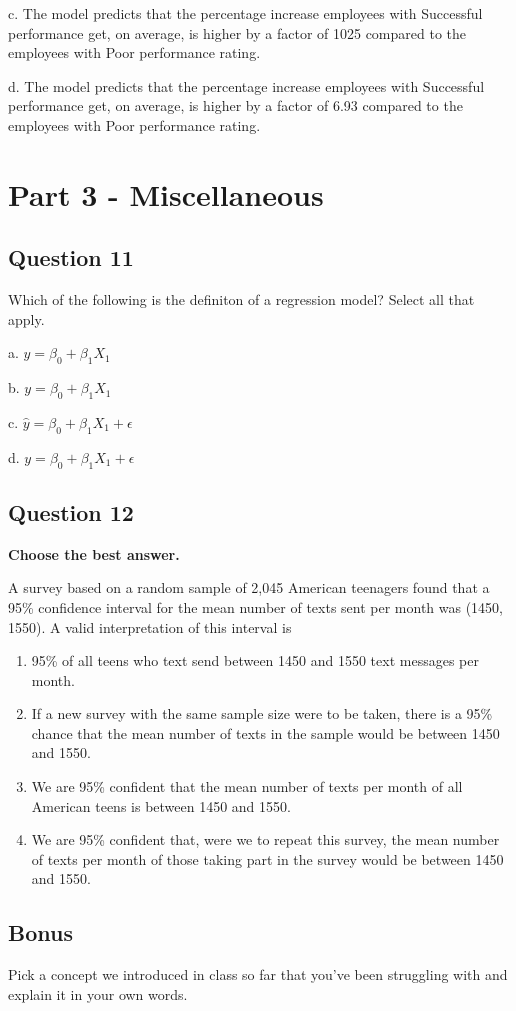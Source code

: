 \documentclass[
  letterpaper,
  DIV=11,
  numbers=noendperiod]{scrartcl}
\providecommand{\tightlist}{%
  \setlength{\itemsep}{0pt}\setlength{\parskip}{0pt}}\usepackage{longtable,booktabs,array}
\begin{document}
c. The model predicts that the percentage increase employees with
Successful performance get, on average, is higher by a factor of 1025
compared to the employees with Poor performance rating.

d. The model predicts that the percentage increase employees with
Successful performance get, on average, is higher by a factor of 6.93
compared to the employees with Poor performance rating.

\section{Part 3 - Miscellaneous}\label{part-3---miscellaneous}

\subsection{Question 11}\label{question-11}

Which of the following is the definiton of a regression model? Select
all that apply.

a. \(\hat{y} = \beta_0 + \beta_1 X_1\)

b. \(y = \beta_0 + \beta_1 X_1\)

c. \(\hat{y} = \beta_0 + \beta_1 X_1 + \epsilon\)

d. \(y = \beta_0 + \beta_1 X_1 + \epsilon\)

\subsection{Question 12}\label{question-12}

\textbf{Choose the best answer.}

A survey based on a random sample of 2,045 American teenagers found that
a 95\% confidence interval for the mean number of texts sent per month
was (1450, 1550). A valid interpretation of this interval is

\begin{enumerate}
\def\labelenumi{\alph{enumi}.}
\tightlist
\item
  95\% of all teens who text send between 1450 and 1550 text messages
  per month.
\item
  If a new survey with the same sample size were to be taken, there is a
  95\% chance that the mean number of texts in the sample would be
  between 1450 and 1550.
\item
  We are 95\% confident that the mean number of texts per month of all
  American teens is between 1450 and 1550.
\item
  We are 95\% confident that, were we to repeat this survey, the mean
  number of texts per month of those taking part in the survey would be
  between 1450 and 1550.
\end{enumerate}

\newpage{}

\subsection{Bonus}\label{bonus}

Pick a concept we introduced in class so far that you've been struggling
with and explain it in your own words.
\end{document}
